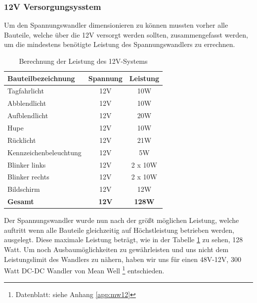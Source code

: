 \subsubsection{12V Versorgungsysstem}

Um den Spannungswandler dimensionieren zu können mussten vorher alle Bauteile, welche über die 12V versorgt werden sollten, zusammengefasst werden, um die mindestens benötigte Leistung des Spannungswandlers zu errechnen. 

\begin{table}[H]
	\begin{center}
		\begin{tabular}{|l|c|c|}
			\hline
			\textbf{Bauteilbezeichnung}     & \textbf{Spannung} & \textbf{Leistung} \\ \hline
			Tagfahrlicht           & 12V      & 10W      \\ \hline
			Abblendlicht           & 12V      & 10W      \\ \hline
			Aufblendlicht          & 12V      & 20W      \\ \hline
			Hupe                   & 12V      & 10W      \\ \hline
			Rücklicht              & 12V      & 21W      \\ \hline
			Kennzeichenbeleuchtung & 12V      & 5W       \\ \hline
			Blinker links          & 12V      & 2 x 10W  \\ \hline
			Blinker rechts         & 12V      & 2 x 10W  \\ \hline
			Bildschirm             & 12V      & 12W      \\ \hline
			\textbf{Gesamt}                 & \textbf{12V}      & \textbf{128W}     \\ \hline
		\end{tabular}
			\caption{Berechnung der Leistung des 12V-Systems}
			\label{tab:leistung12V}
	\end{center}
\end{table}

Der Spannungswandler wurde nun nach der größt möglichen Leistung, welche auftritt wenn alle Bauteile gleichzeitig auf Höchstleistung betrieben werden, ausgelegt. Diese maximale Leistung beträgt, wie in der Tabelle \ref{tab:leistung12V} zu sehen, 128 Watt. Um noch Ausbaumöglichkeiten zu gewährleisten und uns nicht dem Leistungslimit des Wandlers zu nähern, haben wir uns für einen 48V-12V, 300 Watt DC-DC Wandler von Mean Well \footnote{Datenblatt: siehe Anhang \ref{app:mw12}} entschieden. 

